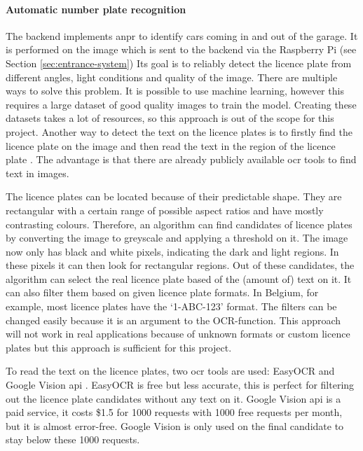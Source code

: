 \paragraph{Automatic number plate recognition}\label{sec:anpr}
The backend implements \ac{anpr} to identify cars coming in and out of the garage. It is performed on the image which is sent to the backend via the Raspberry Pi (see Section \ref{sec:entrance-system}) Its goal is to reliably detect the licence plate from different angles, light conditions and quality of the image. There are multiple ways to solve this problem. It is possible to use machine learning, however this requires a large dataset of good quality images to train the model. Creating these datasets takes a lot of resources, so this approach is out of the scope for this project. Another way to detect the text on the licence plates is to firstly find the licence plate on the image and then read the text in the region of the licence plate \cite{anpr}. The advantage is that there are already publicly available \ac{ocr} tools to find text in images. 

\ind The licence plates can be located because of their predictable shape. They are rectangular with a certain range of possible aspect ratios and have mostly contrasting colours. Therefore, an algorithm can find candidates of licence plates by converting the image to greyscale and applying a threshold on it. The image now only has black and white pixels, indicating the dark and light regions. In these pixels it can then look for rectangular regions. Out of these candidates, the algorithm can select the real licence plate based of the (amount of) text on it. It can also filter them based on given licence plate formats. In Belgium, for example, most licence plates have the `1-ABC-123' format. The filters can be changed easily because it is an argument to the OCR-function. This approach will not work in real applications because of unknown formats or custom licence plates but this approach is sufficient for this project.

\ind To read the text on the licence plates, two \ac{ocr} tools are used: EasyOCR \cite{easyocr} and Google Vision \ac{api} \cite{googlevision}. EasyOCR is free but less accurate, this is perfect for filtering out the licence plate candidates without any text on it. Google Vision \ac{api} is a paid service, it costs \$1.5 for 1000 requests with 1000 free requests per month, but it is almost error-free. Google Vision is only used on the final candidate to stay below these 1000 requests.

